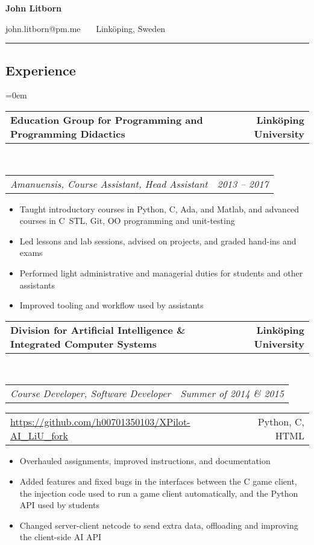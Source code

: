 \documentclass[10pt,letterpaper]{article}
\makeatletter
\newcommand{\headerrow}[2]
{\begin{tabular*}{\linewidth}{l@{\extracolsep{\fill}}r}
	#1 &
	#2 \\
\end{tabular*}}
\newcommand{\CPP}
{C\nolinebreak[4]\hspace{-.05em}\raisebox{.22ex}{\footnotesize\bf ++}}
\makeatother
\begin{document}
\begin{center}
    {\LARGE \textbf{John Litborn}}

    john.litborn@pm.me
    \ \textbullet \ \
    Linköping, Sweden
\end{center}

\hrule
\vspace{-0.4em}
\subsection*{Experience}

\parindent=0em
\headerrow
{\textbf{Education Group for Programming and Programming
Didactics}}
{\textbf{Linköping University}}
\\
\headerrow
{\emph{Amanuensis, Course Assistant, Head Assistant}}
{\emph{2013 -- 2017}}
\begin{itemize}[noitemsep, topsep=0pt]
    \item Taught introductory courses in Python, \CPP, Ada, and Matlab, and
        advanced courses in \CPP \ STL, Git, OO programming and unit-testing
    \item Led lessons and lab sessions, advised on projects, and graded
        hand-ins and exams
    \item Performed light administrative and managerial duties for students
        and other assistants
    \item Improved tooling and workflow used by assistants
\end{itemize}
\vspace{0.5em}
\headerrow
{\textbf{Division for Artificial Intelligence \& Integrated Computer Systems}}
{\textbf{Linköping University}}
\\
\headerrow
{\emph{Course Developer, Software Developer}}
{\emph{Summer of 2014 \& 2015}}
\headerrow
{\url{https://github.com/h00701350103/XPilot-AI\_LiU\_fork}}
{Python, C, HTML}
\begin{itemize}[noitemsep, topsep=0pt]
    \item Overhauled assignments, improved instructions, and
        documentation
    \item Added features and fixed bugs in the interfaces
        between the C game client, the injection code used to run a game
        client automatically, and the Python API used by students
    \item Changed server-client netcode to send extra data, offloading and
        improving the client-side AI API
\end{itemize}
\vspace{0.5em}
\end{document}

